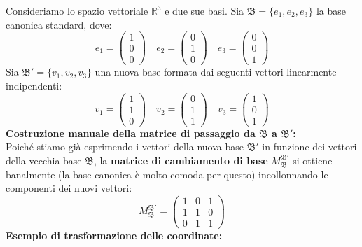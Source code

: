         \begin{richiamo}
        Consideriamo lo spazio vettoriale $\mathbb{R}^3$ e due sue basi.
        Sia $\mathfrak{B} = \{e_1, e_2, e_3\}$ la base canonica standard, dove:
        \[
        e_1 = \begin{pmatrix} 1 \\ 0 \\ 0 \end{pmatrix} \quad e_2 = \begin{pmatrix} 0 \\ 1 \\ 0 \end{pmatrix} \quad e_3 = \begin{pmatrix} 0 \\ 0 \\ 1 \end{pmatrix}
        \]
        Sia $\mathfrak{B}' = \{v_1, v_2, v_3\}$ una nuova base formata dai seguenti vettori linearmente indipendenti:
        \[
        v_1 = \begin{pmatrix} 1 \\ 1 \\ 0 \end{pmatrix} \quad v_2 = \begin{pmatrix} 0 \\ 1 \\ 1 \end{pmatrix} \quad v_3 = \begin{pmatrix} 1 \\ 0 \\ 1 \end{pmatrix}
        \]
        \textbf{Costruzione manuale della matrice di passaggio da $\mathfrak{B}$ a $\mathfrak{B}'$:} \\
        Poiché stiamo già esprimendo i vettori della nuova base $\mathfrak{B}'$ in funzione dei vettori della vecchia base
         $\mathfrak{B}$, la \textbf{matrice di cambiamento di base} $M_{\mathfrak{B}}^{\mathfrak{B}'}$ si ottiene banalmente (la base canonica è molto comoda 
         per questo) incollonnando le componenti dei nuovi vettori:
        \[
        M_{\mathfrak{B}}^{\mathfrak{B}'} = \begin{pmatrix} 
        1 & 0 & 1 \\ 
        1 & 1 & 0 \\ 
        0 & 1 & 1 
        \end{pmatrix}
        \] 
        \textbf{Esempio di trasformazione delle coordinate:} \\

\end{richiamo}

